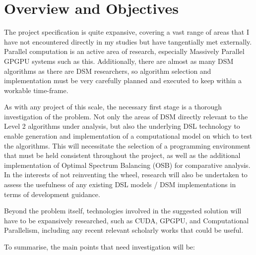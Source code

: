 \section{Overview and Objectives}
\label{sec:overview}
The project specification is quite expansive, covering a vast range of areas that I have not encountered directly in my studies but have tangentially met externally. Parallel computation is an active area of research, especially Massively Parallel GPGPU systems such as this. Additionally, there are almost as many DSM algorithms as there are DSM researchers, so algorithm selection and implementation must be very carefully planned and executed to keep within a workable time-frame.

As with any project of this scale, the necessary first stage is a thorough investigation of the problem. Not only the areas of DSM directly relevant to the Level 2 algorithms under analysis, but also the underlying DSL technology to enable generation and implementation of a computational model on which to test the algorithms. This will necessitate the selection of a programming environment that must be held consistent throughout the project, as well as the additional implementation of Optimal Spectrum Balancing (OSB) for comparative analysis. In the interests of not reinventing the wheel, research will also be undertaken to assess the usefulness of any existing DSL models / DSM implementations in terms of development guidance.

Beyond the problem itself, technologies involved in the suggested solution will have to be expansively researched, such as CUDA, GPGPU, and Computational Parallelism, including any recent relevant scholarly works that could be useful.

To summarise, the main points that need investigation will be:


